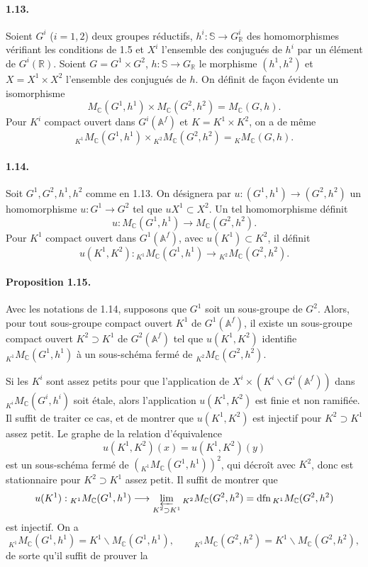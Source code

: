 \documentclass[10pt]{article}
\newcommand{\Af}{\mathbb A^f}
\newcommand{\C}{\mathbb C}
\newcommand{\R}{\mathbb R}
\newcommand{\bS}{\mathbb S}
\newcommand{\dfn}{\operatorname{dfn}}
\newcommand{\limproj}{\varprojlim}
\newcommand{\MC}{M_{\C}}
\begin{document}
\paragraph{1.13.} Soient $G^i$ ($i=1,2$) deux groupes réductifs, $h^i:\bS\to G^i_\R$ des homomorphismes vérifiant les conditions de 1.5 et $X^i$ l'ensemble des conjugués de $h^i$ par un élément de $G^i(\R)$. Soient $G=G^1\times G^2$, $h:\bS\to G_\R$ le morphisme $(h^1,h^2)$ et $X=X^1\times X^2$ l'ensemble des conjugués de $h$. On définit de façon évidente un isomorphisme
\[
\MC(G^1,h^1)\times\MC(G^2,h^2)=\MC(G,h). \tag{1.13.1}
\]
Pour $K^i$ compact ouvert dans $G^i(\Af)$ et $K=K^1\times K^2$, on a de même
\[
{}_{K^1}\MC(G^1,h^1)\times{}_{K^2}\MC(G^2,h^2)={}_K\MC(G,h). \tag{1.13.2}
\]

\paragraph{1.14.} Soit $G^1,G^2,h^1,h^2$ comme en 1.13. On désignera par $u:(G^1,h^1)\to(G^2,h^2)$ un homomorphisme $u:G^1\to G^2$ tel que $uX^1\subset X^2$. Un tel homomorphisme définit
\[
u:\MC(G^1,h^1)\longrightarrow\MC(G^2,h^2). \tag{1.14.1}
\]
Pour $K^1$ compact ouvert dans $G^1(\Af)$, avec $u(K^1)\subset K^2$, il définit
\[
u(K^1,K^2):{}_{K^1}\MC(G^1,h^1)\longrightarrow{}_{K^2}\MC(G^2,h^2). \tag{1.14.2}
\]

\paragraph{Proposition 1.15.} Avec les notations de 1.14, supposons que $G^1$ soit un sous-groupe de $G^2$. Alors, pour tout sous-groupe compact ouvert $K^1$ de $G^1(\Af)$, il existe un sous-groupe compact ouvert $K^2\supset K^1$ de $G^2(\Af)$ tel que $u(K^1,K^2)$ identifie ${}_{K^1}\MC(G^1,h^1)$ à un sous-schéma fermé de ${}_{K^2}\MC(G^2,h^2)$.

Si les $K^i$ sont assez petits pour que l'application de $X^i\times(K^i\backslash G^i(\Af))$ dans ${}_{K^i}\MC(G^i,h^i)$ soit étale, alors l'application $u(K^1,K^2)$ est finie et non ramifiée. Il suffit de traiter ce cas, et de montrer que $u(K^1,K^2)$ est injectif pour $K^2\supset K^1$ assez petit. Le graphe de la relation d'équivalence
\[
u(K^1,K^2)(x)=u(K^1,K^2)(y)
\]
est un sous-schéma fermé de $({}_{K^1}\MC(G^1,h^1))^2$, qui décroît avec $K^2$, donc est stationnaire pour $K^2\supset K^1$ assez petit. Il suffit de montrer que
\[
u(K^1):{}_{K^1}\MC(G^1,h^1)\longrightarrow\limproj_{K^2\supset K^1}{}_{K^2}\MC(G^2,h^2)=\dfn{}_{K^1}\MC(G^2,h^2)
\]
est injectif. On a
\[
{}_{K^1}\MC(G^1,h^1)=K^1\backslash \MC(G^1,h^1),
\qquad
{}_{K^1}\MC(G^2,h^2)=K^1\backslash \MC(G^2,h^2),
\]
de sorte qu'il suffit de prouver la
\end{document}
